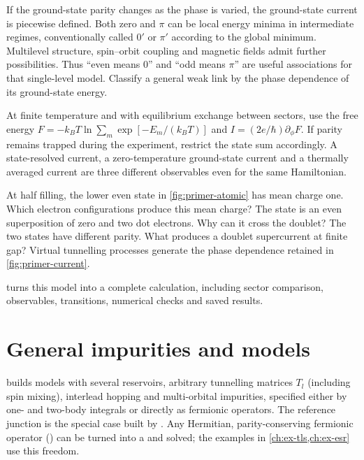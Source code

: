 If the ground-state parity changes as the phase is varied, the ground-state current is
piecewise defined. Both zero and $\pi$ can be local energy minima in intermediate
regimes, conventionally called $0'$ or $\pi'$ according to the global minimum.
Multilevel structure, spin--orbit coupling and magnetic fields admit further
possibilities. Thus ``even means 0'' and ``odd means $\pi$'' are useful
associations for that single-level model. Classify a general weak link by the
phase dependence of its ground-state energy.

At finite temperature and with equilibrium exchange between sectors, use the
free energy $F=-k_BT\ln\sum_m\exp[-E_m/(k_BT)]$ and
$I=(2e/\hbar)\partial_\phi F$. If parity remains trapped during the experiment,
restrict the state sum accordingly. A state-resolved current, a zero-temperature
ground-state current and a thermally averaged current are three different
observables even for the same Hamiltonian.

\begin{physics}
At half filling, the lower even state in \cref{fig:primer-atomic} has mean charge
one. Which electron configurations produce this mean charge? The state is an
even superposition of zero and two dot electrons. Why can it cross the doublet?
The two states have different parity. What produces a doublet supercurrent at
finite gap? Virtual tunnelling processes generate the phase dependence retained
in \cref{fig:primer-current}.
\end{physics}

 turns this model into a complete calculation, including
sector comparison, observables, transitions, numerical checks and saved results.

\section{General impurities and models}\label{sec:general-impurity}

 builds models with several reservoirs, arbitrary tunnelling matrices
$T_l$ (including spin mixing), interlead hopping and multi-orbital impurities, specified
either by one- and two-body integrals or directly as fermionic operators. The reference
junction is the special case built by . Any Hermitian,
parity-conserving fermionic operator () can be turned into a
 and solved; the examples in \cref{ch:ex-tls,ch:ex-esr} use this freedom.

